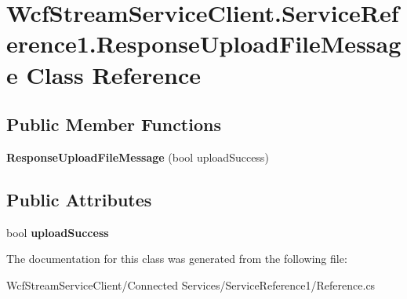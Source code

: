 \hypertarget{class_wcf_stream_service_client_1_1_service_reference1_1_1_response_upload_file_message}{}\section{Wcf\+Stream\+Service\+Client.\+Service\+Reference1.\+Response\+Upload\+File\+Message Class Reference}
\label{class_wcf_stream_service_client_1_1_service_reference1_1_1_response_upload_file_message}
\subsection*{Public Member Functions}
\begin{DoxyCompactItemize}
\item 
\mbox{\label{class_wcf_stream_service_client_1_1_service_reference1_1_1_response_upload_file_message_acd4d979059f38729d27fb06c4f39468a}} 
{\bfseries Response\+Upload\+File\+Message} (bool upload\+Success)
\end{DoxyCompactItemize}
\subsection*{Public Attributes}
\begin{DoxyCompactItemize}
\item 
\mbox{\label{class_wcf_stream_service_client_1_1_service_reference1_1_1_response_upload_file_message_a6755e04d8e3f84e5201de09bc499b735}} 
bool {\bfseries upload\+Success}
\end{DoxyCompactItemize}


The documentation for this class was generated from the following file\+:\begin{DoxyCompactItemize}
\item 
Wcf\+Stream\+Service\+Client/\+Connected Services/\+Service\+Reference1/Reference.\+cs\end{DoxyCompactItemize}
